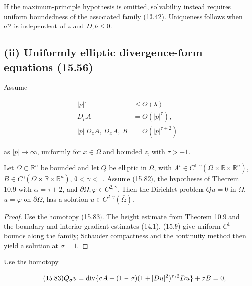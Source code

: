 If the maximum-principle hypothesis is omitted, solvability instead requires
uniform boundedness of the associated family (13.42). Uniqueness follows when
\(a^{ij}\) is independent of \(z\) and \(D_zb\le0\).

\medskip

\subsection*{(ii) Uniformly elliptic divergence-form equations (15.56)}
Assume

\begin{equation}\tag{15.82}
\begin{aligned}
|p|^\tau &\leq O(\lambda)\\
D_p A &= O(|p|^\tau),\\
|p|\,D_z A,\ D_x A,\ B &= O(|p|^{\tau+2})
\end{aligned}
\end{equation}

as \(|p|\to\infty\), uniformly for \(x\in\Omega\) and bounded \(z\), with \(\tau>-1\).

\medskip

\begin{theorem}\label{gilbarg-trudinger.thm.15.11.divergence-existence}
Let \(\Omega\subset\mathbb R^n\) be bounded and let \(Q\) be elliptic in
\(\overline\Omega\), with \(A^i\in C^{1,\gamma}(\overline\Omega\times\mathbb R\times\mathbb R^n)\),
\(B\in C^\gamma(\overline\Omega\times\mathbb R\times\mathbb R^n)\), \(0<\gamma<1\).
Assume (15.82), the hypotheses of Theorem 10.9 with \(\alpha=\tau+2\), and
\(\partial\Omega,\varphi\in C^{2,\gamma}\). Then the Dirichlet problem
\(Qu=0\) in \(\Omega\), \(u=\varphi\) on \(\partial\Omega\), has a solution
\(u\in C^{2,\gamma}(\overline\Omega)\).
\end{theorem}
\begin{proof}
\sketch Use the homotopy (15.83). The height estimate from Theorem 10.9 and
the boundary and interior gradient estimates (14.1), (15.9) give uniform
\(C^1\) bounds along the family; Schauder compactness and the continuity method
then yield a solution at \(\sigma=1\).
\end{proof}

\medskip

Use the homotopy

\begin{equation}\tag{15.83}
Q_\sigma u=\operatorname{div}\{\sigma A+(1-\sigma)(1+|Du|^2)^{\tau/2}Du\}+\sigma B=0,
\end{equation}

